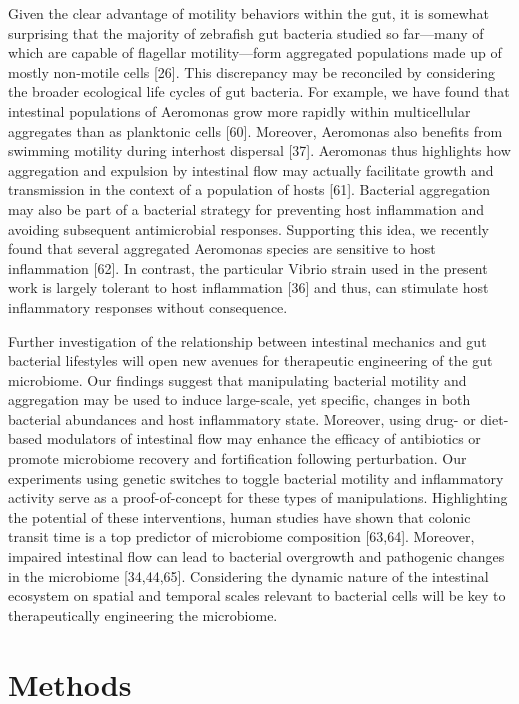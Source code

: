 Given the clear advantage of motility behaviors within the gut, it is somewhat surprising that the majority of zebrafish gut bacteria studied so far—many of which are capable of flagellar motility—form aggregated populations made up of mostly non-motile cells [26]. This discrepancy may be reconciled by considering the broader ecological life cycles of gut bacteria. For example, we have found that intestinal populations of Aeromonas grow more rapidly within multicellular aggregates than as planktonic cells [60]. Moreover, Aeromonas also benefits from swimming motility during interhost dispersal [37]. Aeromonas thus highlights how aggregation and expulsion by intestinal flow may actually facilitate growth and transmission in the context of a population of hosts [61]. Bacterial aggregation may also be part of a bacterial strategy for preventing host inflammation and avoiding subsequent antimicrobial responses. Supporting this idea, we recently found that several aggregated Aeromonas species are sensitive to host inflammation [62]. In contrast, the particular Vibrio strain used in the present work is largely tolerant to host inflammation [36] and thus, can stimulate host inflammatory responses without consequence.

Further investigation of the relationship between intestinal mechanics and gut bacterial lifestyles will open new avenues for therapeutic engineering of the gut microbiome. Our findings suggest that manipulating bacterial motility and aggregation may be used to induce large-scale, yet specific, changes in both bacterial abundances and host inflammatory state. Moreover, using drug- or diet-based modulators of intestinal flow may enhance the efficacy of antibiotics or promote microbiome recovery and fortification following perturbation. Our experiments using genetic switches to toggle bacterial motility and inflammatory activity serve as a proof-of-concept for these types of manipulations. Highlighting the potential of these interventions, human studies have shown that colonic transit time is a top predictor of microbiome composition [63,64]. Moreover, impaired intestinal flow can lead to bacterial overgrowth and pathogenic changes in the microbiome [34,44,65]. Considering the dynamic nature of the intestinal ecosystem on spatial and temporal scales relevant to bacterial cells will be key to therapeutically engineering the microbiome. 

\section{Methods}
